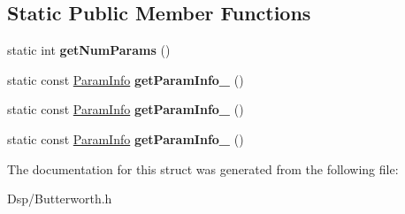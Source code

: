 \subsection*{Static Public Member Functions}
\begin{DoxyCompactItemize}
\item 
\hypertarget{structDsp_1_1Butterworth_1_1Design_1_1TypeIVBase_ae02654aa1f2b4a378d48f5d9cc5f5717}{static int {\bfseries get\-Num\-Params} ()}\label{structDsp_1_1Butterworth_1_1Design_1_1TypeIVBase_ae02654aa1f2b4a378d48f5d9cc5f5717}

\item 
\hypertarget{structDsp_1_1Butterworth_1_1Design_1_1TypeIVBase_a289def7ea4c38835455c758af20a84e1}{static const \hyperlink{classDsp_1_1ParamInfo}{Param\-Info} {\bfseries get\-Param\-Info\-\_} ()}\label{structDsp_1_1Butterworth_1_1Design_1_1TypeIVBase_a289def7ea4c38835455c758af20a84e1}

\item 
\hypertarget{structDsp_1_1Butterworth_1_1Design_1_1TypeIVBase_a2f857add030f99482c69149211ee3eeb}{static const \hyperlink{classDsp_1_1ParamInfo}{Param\-Info} {\bfseries get\-Param\-Info\-\_} ()}\label{structDsp_1_1Butterworth_1_1Design_1_1TypeIVBase_a2f857add030f99482c69149211ee3eeb}

\item 
\hypertarget{structDsp_1_1Butterworth_1_1Design_1_1TypeIVBase_a66c918cf20f7e2651bff74d627e580f4}{static const \hyperlink{classDsp_1_1ParamInfo}{Param\-Info} {\bfseries get\-Param\-Info\-\_} ()}\label{structDsp_1_1Butterworth_1_1Design_1_1TypeIVBase_a66c918cf20f7e2651bff74d627e580f4}

\end{DoxyCompactItemize}


The documentation for this struct was generated from the following file\-:\begin{DoxyCompactItemize}
\item 
Dsp/Butterworth.\-h\end{DoxyCompactItemize}
